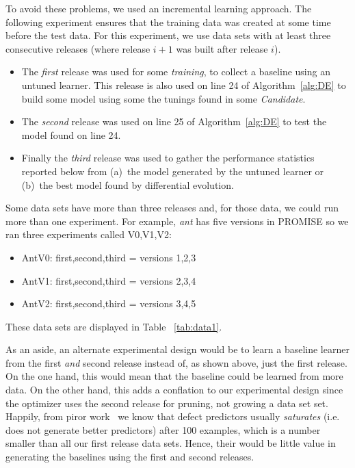 \documentclass{sig-alternative}
\newcommand{\bi}{\begin{itemize}[leftmargin=0.4cm]}
\newcommand{\ei}{\end{itemize}}
\newcommand{\tion}[1]{\S\ref{sect:#1}}
\newcommand{\tab}[1]{Table ~\ref{tab:#1}}
\begin{document}
To avoid these problems, we used an incremental learning approach. The following
experiment ensures that the training data was created at some time before the test
data.
For this experiment, we use data sets with at least three  
consecutive releases  (where release $i+1$ was built after release $i$).
\bi 
\item The {\em first} release was used for some  {\em training}, to collect a baseline
   using an untuned learner. This release is also used  on line 24 of Algorithm~\ref{alg:DE} to
   build some model using some the tunings found in some {\em Candidate}.
   \item The {\em second} release was used on line 25 of Algorithm~\ref{alg:DE} to 
   test the model found on line 24.
   \item Finally the {\em third} release was used to gather the performance statistics
   reported below from (a)~the model generated by the untuned learner or (b)~the
   best model found by differential evolution.
   \ei

Some data sets have more than three releases and, for those data, we could run more
 than one experiment. For example, {\em ant} has five versions in PROMISE so
 we ran three experiments called V0,V1,V2:
 \bi
 \item AntV0: first,second,third = versions 1,2,3
 \item AntV1: first,second,third = versions 2,3,4
 \item AntV2: first,second,third = versions 3,4,5
 \ei 
These data sets are displayed in \tab{data1}.

As an aside, an alternate experimental design would be to 
learn a baseline learner from the first {\em and} second release
instead of, as shown above,  just the first release. On the one hand,
this would mean that the baseline could be learned from more data.
On the other hand, this adds a conflation to our experimental design
since the optimizer uses the second release for pruning, not growing a data set set.  Happily, from 
piror work~\cite{Menzies:2008aa} we know that defect predictors usually {\em saturates} (i.e.
does not generate better predictors) after 100 examples, which is a number smaller than all our first release data sets. Hence, their would
be little value in generating the baselines using the first and second
releases. 
\end{document}
